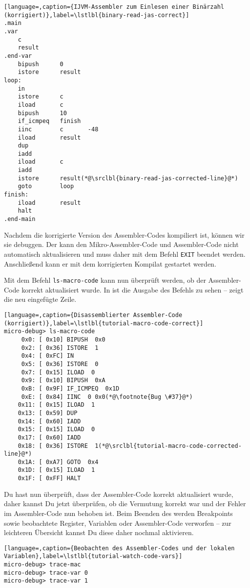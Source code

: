 \begin{lstlisting}[language=,caption={IJVM-Assembler zum Einlesen einer Binärzahl (korrigiert)},label=\lstlbl{binary-read-jas-correct}]
.main
.var
    c
    result
.end-var
    bipush      0
    istore      result
loop:
    in
    istore      c
    iload       c
    bipush      10
    if_icmpeq   finish
    iinc        c       -48
    iload       result
    dup
    iadd
    iload       c
    iadd
    istore      result(*@\srclbl{binary-read-jas-corrected-line}@*)
    goto        loop
finish:
    iload       result
    halt
.end-main
\end{lstlisting}

Nachdem die korrigierte Version des Assembler-Codes kompiliert ist, können wir sie debuggen. Der \md kann den Mikro-Assembler-Code und Assembler-Code nicht automatisch aktualisieren und muss daher mit dem Befehl \texttt{EXIT} beendet werden. Anschließend kann er mit dem korrigierten Kompilat gestartet werden.

Mit dem Befehl \texttt{ls-macro-code} kann nun überprüft werden, ob der Assembler-Code korrekt aktualisiert wurde. In  ist die Ausgabe des Befehls zu sehen --  zeigt die neu eingefügte Zeile.

\begin{lstlisting}[language=,caption={Disassemblierter Assembler-Code (korrigiert)},label=\lstlbl{tutorial-macro-code-correct}]
micro-debug> ls-macro-code
     0x0: [ 0x10] BIPUSH  0x0
     0x2: [ 0x36] ISTORE  1
     0x4: [ 0xFC] IN 
     0x5: [ 0x36] ISTORE  0
     0x7: [ 0x15] ILOAD  0
     0x9: [ 0x10] BIPUSH  0xA
     0xB: [ 0x9F] IF_ICMPEQ  0x1D
     0xE: [ 0x84] IINC  0 0x0(*@\footnote{Bug \#37}@*)
    0x11: [ 0x15] ILOAD  1
    0x13: [ 0x59] DUP 
    0x14: [ 0x60] IADD 
    0x15: [ 0x15] ILOAD  0
    0x17: [ 0x60] IADD 
    0x18: [ 0x36] ISTORE  1(*@\srclbl{tutorial-macro-code-corrected-line}@*)
    0x1A: [ 0xA7] GOTO  0x4
    0x1D: [ 0x15] ILOAD  1
    0x1F: [ 0xFF] HALT 
\end{lstlisting}

Du hast nun überprüft, dass der Assembler-Code korrekt aktualisiert wurde, daher kannst Du jetzt überprüfen, ob die Vermutung korrekt war und der Fehler im Assembler-Code nun behoben ist. Beim Beenden des \md werden Breakpoints sowie beobachtete Register, Variablen oder Assembler-Code verworfen -- zur leichteren Übersicht kannst Du diese daher nochmal aktivieren.

\begin{lstlisting}[language=,caption={Beobachten des Assembler-Codes und der lokalen Variablen},label=\lstlbl{tutorial-watch-code-vars}]
micro-debug> trace-mac
micro-debug> trace-var 0
micro-debug> trace-var 1
\end{lstlisting}

